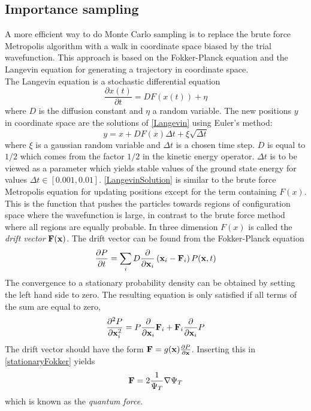 \documentclass[english, a4paper]{article}
\begin{document}
\subsection{Importance sampling}

A more efficient way to do Monte Carlo sampling is to replace the brute force Metropolis algorithm
with a walk in coordinate space biased by the trial wavefunction. This approach is based on the 
Fokker-Planck equation and the Langevin equation for generating a trajectory in coordinate space. \\

\noindent The Langevin equation is a stochastic differential equation
\begin{equation}
 \frac{\partial x(t)}{\partial t} = D F(x(t)) + \eta
 \label{Langevin}
\end{equation}
where $D$ is the diffusion constant and $\eta$ a random variable.
The new positions $y$ in coordinate space are the solutions of \eqref{Langevin} using Euler's method:
\begin{equation}
 y = x + DF(x)\Delta t + \xi \sqrt{\Delta t}
 \label{LangevinSolution}
\end{equation}
where $\xi$ is a gaussian random variable and $\Delta t$ is a chosen time step. $D$ is equal to $1/2$
which comes from the factor $1/2$ in the kinetic energy operator. $\Delta t$ is to be viewed as a
parameter which yields stable values of the ground state energy for values $\Delta t \in [0.001, 0.01]$.
\eqref{LangevinSolution} is similar to the brute force Metropolis equation for updating positions except for the
term  containing $F(x)$. This is the function that pushes the particles towards regions of configuration space
where the wavefunction is large, in contrast to the brute force method where all regions are equally probable. 
In three dimension $F(x)$ is called the \textit{drift vector} ${\bf F}({\bf x})$.
The drift vector can be found from the
Fokker-Planck equation
\begin{equation}
 \frac{\partial P}{\partial t} = \sum_i D \frac{\partial}{\partial {\bf x}_i}
 \left( {\bf x}_i - {\bf F}_i \right) P({\bf x}, t)
 \label{FokkerPlanck}
\end{equation}
The convergence to a stationary probability density can be obtained by setting the left hand side to zero. 
The resulting equation is only satisfied if all terms of the sum are equal to zero, 
\begin{equation}
 \frac{\partial^2 P}{\partial {\bf x}_i^2} = P \frac{\partial}{\partial {\bf x}_i} {\bf F}_i
 + {\bf F}_i \frac{\partial}{\partial {\bf x}_i} P
 \label{stationaryFokker}
\end{equation}
The drift vector should have the form ${\bf F} = g({\bf x}) \frac{\partial P}{\partial {\bf x}}$. Inserting this in
\eqref{stationaryFokker} yields 
\begin{equation}
 {\bf F} = 2 \frac{1}{\Psi_T} \nabla \Psi_T
\end{equation}
which is known as the \textit{quantum force}. \\
\end{document}
